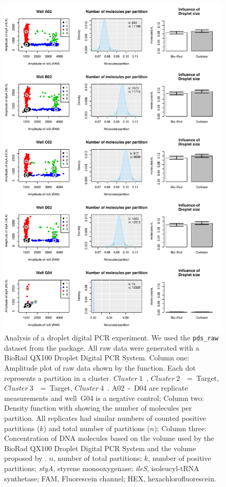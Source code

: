 \begin{figure}[htbp]
\centering
  \includegraphics[clip=true, trim=0.1cm 0.4cm 0.7cm 0.3cm, width=12cm]{figures/dpcR_bioamp.pdf}
    \caption{Analysis of a droplet digital PCR experiment. We used the 
\texttt{pds\_raw} dataset from the  package. All raw data were 
generated with a BioRad QX100 Droplet Digital PCR System. Column one: Amplitude 
plot of raw data shown by the  function. Each dot represents a 
partition in a cluster. 
$Cluster~1$~\textcolor{black}{\textbf{\textbullet}}, 
$Cluster~2$~\textcolor{red}{\textbf{\textbullet}}~=~Target, 
$Cluster~3$~\textcolor{green}{\textbf{\textbullet}}~=~Target, 
$Cluster~4$~\textcolor{blue}{\textbf{\textbullet}}. A02~-~D04 are 
replicate measurements and well~G04 is a negative control; Column two: Density 
function with showing the number of molecules per partition. All replicates had 
similar numbers of counted positive partitions ($k$) and total number of 
partitions ($n$); Column three: Concentration of DNA molecules based on the 
volume used by the BioRad QX100 Droplet Digital PCR System and the volume 
proposed by \citet{corbisier_2015}. $n$, number of total partitions; $k$, number 
of positive partitions; \textit{styA}, styrene monooxygenase; \textit{ileS}, isoleucyl-tRNA 
synthetase; FAM, Fluorescein channel; HEX, hexachlorofluorescein. 
    }  \label{figure:dpcR_bioamp}
\end{figure}

